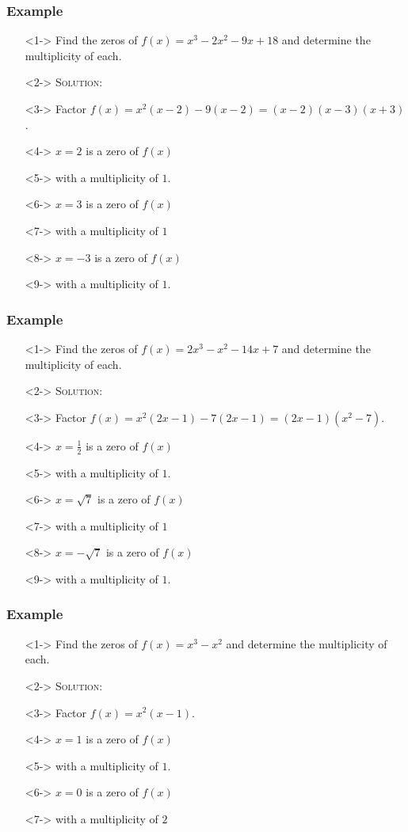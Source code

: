 \documentclass{beamer}
\begin{document}
\begin{frame}
  \frametitle{Example}
    \begin{enumerate}
      \item[]<1-> Find the zeros of $f(x)=x^{3}-2x^{2}-9x+18$ and determine the multiplicity of each.
      \item[]<2-> \textsc{Solution:}
      \item[]<3-> Factor $f(x)=x^{2}(x-2)-9(x-2)=(x-2)(x-3)(x+3)$.
      \item[]<4-> $x=2$ is a zero of $f(x)$
      \item[]<5-> with a multiplicity of $1$.
      \item[]<6-> $x=3$ is a zero of $f(x)$
      \item[]<7-> with a multiplicity of $1$
      \item[]<8-> $x=-3$ is a zero of $f(x)$
      \item[]<9-> with a multiplicity of $1$.
    \end{enumerate}
\end{frame}

\begin{frame}
  \frametitle{Example}
    \begin{enumerate}
      \item[]<1-> Find the zeros of $f(x)=2x^{3}-x^{2}-14x+7$ and determine the multiplicity of each.
      \item[]<2-> \textsc{Solution:}
      \item[]<3-> Factor $f(x)=x^{2}(2x-1)-7(2x-1)=(2x-1)(x^{2}-7)$.
      \item[]<4-> $x=\frac{1}{2}$ is a zero of $f(x)$
      \item[]<5-> with a multiplicity of $1$.
      \item[]<6-> $x=\sqrt{7}$ is a zero of $f(x)$
      \item[]<7-> with a multiplicity of $1$
      \item[]<8-> $x=-\sqrt{7}$ is a zero of $f(x)$
      \item[]<9-> with a multiplicity of $1$.
    \end{enumerate}
\end{frame}

\begin{frame}
  \frametitle{Example}
    \begin{enumerate}
      \item[]<1-> Find the zeros of $f(x)=x^{3}-x^{2}$ and determine the multiplicity of each.
      \item[]<2-> \textsc{Solution:}
      \item[]<3-> Factor $f(x)=x^{2}(x-1)$.
      \item[]<4-> $x=1$ is a zero of $f(x)$
      \item[]<5-> with a multiplicity of $1$.
      \item[]<6-> $x=0$ is a zero of $f(x)$
      \item[]<7-> with a multiplicity of $2$
    \end{enumerate}
\end{frame}
\end{document}
